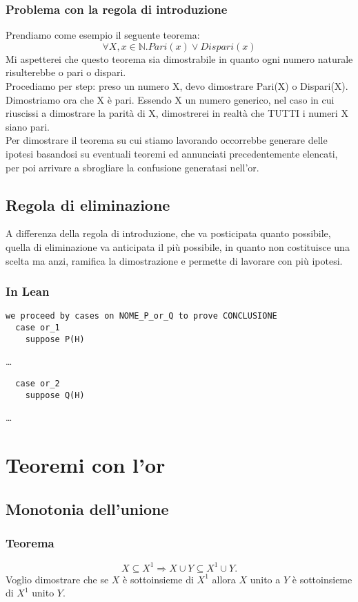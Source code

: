 \documentclass[12pt]{article}
\begin{document}
\subsubsection{Problema con la regola di introduzione}
Prendiamo come esempio il seguente teorema:
\[
    \forall X, x \in \mathbb{N}. Pari(x) \vee Dispari(x)
\]
Mi aspetterei che questo teorema sia dimostrabile in quanto ogni numero naturale risulterebbe o pari o dispari.\\
Procediamo per step: preso un numero X, devo dimostrare Pari(X) o Dispari(X).\\
Dimostriamo ora che X è pari. Essendo X un numero generico, nel caso in cui riuscissi a dimostrare la parità di X, dimostrerei in realtà che TUTTI i numeri X siano pari.\\
Per dimostrare il teorema su cui stiamo lavorando occorrebbe generare delle ipotesi basandosi su eventuali teoremi ed annunciati precedentemente elencati, per poi arrivare a sbrogliare la confusione generatasi nell'or.
\subsection{Regola di eliminazione}
A differenza della regola di introduzione, che va posticipata quanto possibile, quella di eliminazione va anticipata il più possibile, in quanto non costituisce una scelta ma anzi, ramifica la dimostrazione e permette di lavorare con più ipotesi.
\subsubsection{In Lean}
\begin{verbatim}
we proceed by cases on NOME_P_or_Q to prove CONCLUSIONE
  case or_1
    suppose P(H)
\end{verbatim}
\quad \quad \dots
\begin{verbatim}
  case or_2
    suppose Q(H)
\end{verbatim}
\quad \quad \dots
\section{Teoremi con l'or}
\subsection{Monotonia dell'unione}
\subsubsection{Teorema}
\begin{equation}
    X \subseteq X^1 \Rightarrow X \cup Y \subseteq X^1 \cup Y. \label{teo:monotonia_unione}
\end{equation}
Voglio dimostrare che se $X$ è sottoinsieme di $X^1$ allora $X$ unito a $Y$ è sottoinsieme di $X^1$ unito $Y$.
\end{document}
